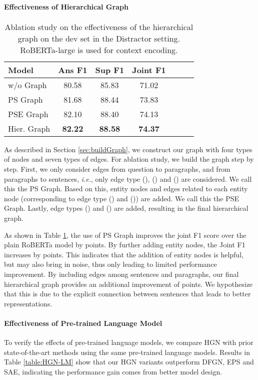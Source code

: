\documentclass[11pt,a4paper]{article}
\begin{document}
\paragraph{Effectiveness of Hierarchical Graph}
\begin{table}[t!]
\centering
\begin{adjustbox}{scale=0.95,center}
\begin{tabular}{lcccccc}
\toprule
Model & Ans F1 & Sup F1  & Joint F1 \\ \midrule
w/o Graph &  80.58 & 85.83 & 71.02 \\ 
PS Graph  & 81.68  & 88.44  & 73.83 \\
PSE Graph  & 82.10 & 88.40 & 74.13 \\
Hier. Graph  & \textbf{82.22}  & \textbf{88.58} & \textbf{74.37} \\ \bottomrule
\end{tabular}
\end{adjustbox}
\caption{\label{table:abl_graph}Ablation study on the effectiveness of the hierarchical graph on the dev set in the Distractor setting. RoBERTa-large is used for context encoding.
}
\end{table} 

As described in Section \ref{sec:buildGraph}, we construct our graph with four types of nodes and seven types of edges. For ablation study, we build the graph step by step. First, we only consider edges from question to paragraphs, and from paragraphs to sentences, \emph{i.e.}, only edge type (), () and () are considered. We call this the PS Graph. Based on this, entity nodes and edges related to each entity node (corresponding to edge type () and ()) are added. We call this the PSE Graph. Lastly, edge types () and () are added, resulting in the final hierarchical graph. 


As shown in Table \ref{table:abl_graph}, the use of PS Graph improves the joint F1 score over the plain RoBERTa model by  points. By further adding entity nodes, the Joint F1 increases by  points. This indicates that the addition of entity nodes is helpful, but may also bring in noise, thus only leading to limited performance improvement. By including edges among sentences and paragraphs, our final hierarchical graph provides an additional improvement of  points. We hypothesize that this is due to the explicit connection between sentences that leads to better representations.
\paragraph{Effectiveness of Pre-trained Language Model}
To verify the effects of pre-trained language models, we 
compare HGN with prior state-of-the-art methods using the same pre-trained language models. Results in Table \ref{table:HGN-LM} show that our HGN variants outperform DFGN, EPS and SAE, indicating the performance gain comes from better model design.
\end{document}
